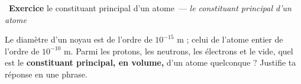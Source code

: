 \documentclass[11pt,a4paper]{article}
\newcounter{exo}
\newcommand{\exo}[1][]{\stepcounter{exo}\par\medskip%
  \noindent{\color{primary}\rule[-2pt]{3.5pt}{15pt}}\ \textbf{\color{primarydark}\large Exercice \theexo}%
  \ifx\relax#1\relax\relax\else\ \textmd{\normalsize\color{black!65}— \itshape #1}\fi\par\nopagebreak\smallskip}
\begin{document}
\exo[le constituant principal d'un atome]
Le diamètre d'un noyau est de l'ordre de $10^{-15}$ m ; celui de l'atome entier de l'ordre de
$10^{-10}$ m. Parmi les protons, les neutrons, les électrons et le vide, quel est le \textbf{constituant
principal, en volume,} d'un atome quelconque ? Justifie ta réponse en une phrase.
\end{document}
